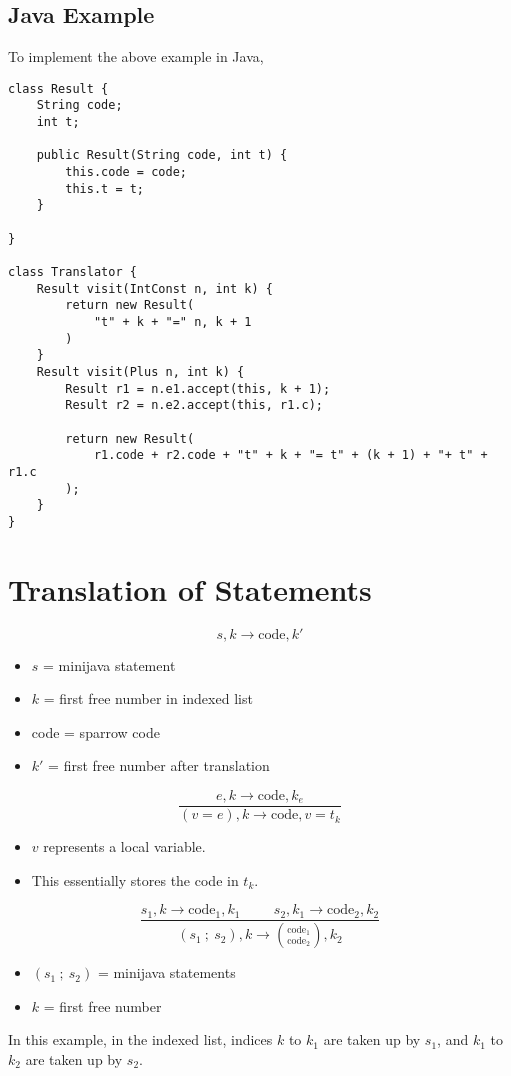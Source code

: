 \documentclass[10pt]{article}
\begin{document}
\subsection*{Java Example}
To implement the above example in Java,
\begin{verbatim}
class Result {
    String code;
    int t;

    public Result(String code, int t) {
        this.code = code;
        this.t = t;
    }

}

class Translator {
    Result visit(IntConst n, int k) {
        return new Result(
            "t" + k + "=" n, k + 1
        )
    }
    Result visit(Plus n, int k) {
        Result r1 = n.e1.accept(this, k + 1);
        Result r2 = n.e2.accept(this, r1.c);

        return new Result(
            r1.code + r2.code + "t" + k + "= t" + (k + 1) + "+ t" + r1.c
        );
    }
}
\end{verbatim}

\section*{Translation of Statements}
\[s, k \rightarrow \text{code}, k'\]
\begin{itemize}
    \item $s$ = minijava statement
    \item $k$ = first free number in indexed list
    \item code = sparrow code
    \item $k'$ = first free number after translation
\end{itemize}
\[\frac{e, k \rightarrow \text{code}, k_e}{(v = e), k \rightarrow \text{code}, v = t_k}\]
\begin{itemize}
    \item $v$ represents a local variable.
    \item This essentially stores the code in $t_k$.
\end{itemize}
\[\frac{s_1, k \rightarrow \text{code}_1, k_1 \hspace{1cm } s_2, k_1 \rightarrow \text{code}_2, k_2}{(s_1 \:;\: s_2), k \rightarrow {\text{code}_1 \choose \text{code}_2}, k_2}\]
\begin{itemize}
    \item $(s_1 \:;\: s_2)$ = minijava statements
    \item $k$ = first free number
\end{itemize}
In this example, in the indexed list, indices $k$ to $k_1$ are taken up by $s_1$, and $k_1$ to $k_2$ are taken up by $s_2$.
\end{document}
